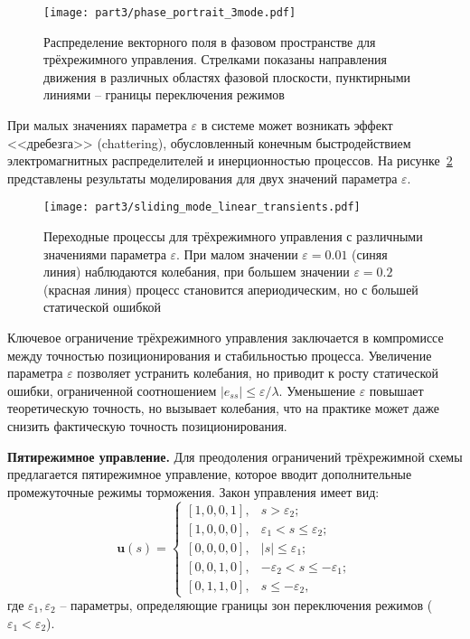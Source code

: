 \begin{figure}[ht]
	\centering
	\texttt{[image: part3/phase\_portrait\_3mode.pdf]}
	\caption{Распределение векторного поля в фазовом пространстве для трёхрежимного управления. Стрелками показаны направления
		движения в различных областях фазовой плоскости, пунктирными линиями -- границы переключения режимов}
	\label{fig:vector_field_linear}
\end{figure}

При малых значениях параметра $\varepsilon$ в системе может возникать эффект <<дребезга>> (chattering),
обусловленный конечным быстродействием электромагнитных распределителей и инерционностью процессов.
На рисунке~\ref{fig:ch3:transient_comparison_linear_mode3} представлены результаты моделирования
для двух значений параметра $\varepsilon$.

\begin{figure}[ht]
	\centering
	\texttt{[image: part3/sliding\_mode\_linear\_transients.pdf]}
	\caption{Переходные процессы для трёхрежимного управления с различными значениями параметра $\varepsilon$.
		При малом значении $\varepsilon = \num{0.01}$ (синяя линия) наблюдаются колебания,
		при большем значении $\varepsilon = \num{0.2}$ (красная линия) процесс становится апериодическим, но с большей статической ошибкой}
	\label{fig:ch3:transient_comparison_linear_mode3}
\end{figure}

Ключевое ограничение трёхрежимного управления заключается в компромиссе между точностью
позиционирования и стабильностью процесса. Увеличение параметра $\varepsilon$ позволяет устранить колебания,
но приводит к росту статической ошибки, ограниченной соотношением $|e_{ss}| \leq \varepsilon/\lambda$. Уменьшение $\varepsilon$
повышает теоретическую точность, но вызывает колебания, что на практике может даже снизить фактическую точность позиционирования.

\textbf{Пятирежимное управление.}
Для преодоления ограничений трёхрежимной схемы предлагается пятирежимное управление,
которое вводит дополнительные промежуточные режимы торможения. Закон управления имеет вид:
\begin{equation}\label{eq:control_law_5_mode}
	\mathbf{u}(s) = \begin{cases}
		[1,0,0,1], & s > \varepsilon_2;                      \\
		[1,0,0,0], & \varepsilon_1 < s \leq \varepsilon_2;   \\
		[0,0,0,0], & |s| \leq \varepsilon_1 ;                \\
		[0,0,1,0], & -\varepsilon_2 < s \leq -\varepsilon_1; \\
		[0,1,1,0], & s \leq -\varepsilon_2,
	\end{cases}
\end{equation}
где $\varepsilon_1, \varepsilon_2$ -- параметры, определяющие границы зон переключения режимов ($\varepsilon_1 < \varepsilon_2$).

